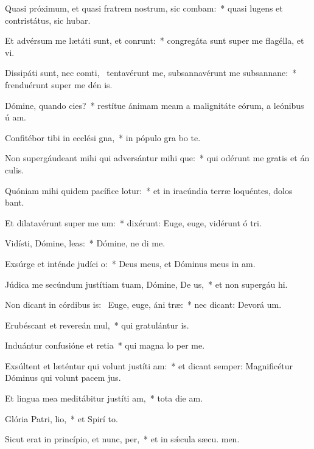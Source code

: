 \item Quasi próximum, et quasi fratrem nostrum, sic combam:~* quasi lugens et contristátus, sic hubar.
\item Et advérsum me lætáti sunt, et conrunt:~* congregáta sunt super me flagélla, et vi.
\item Dissipáti sunt, nec comti,~\pscross{} tentavérunt me, subsannavérunt me subsannane:~* frenduérunt super me dén is.
\item Dómine, quando cies?~* restítue ánimam meam a malignitáte eórum, a leónibus ú am.
\item Confitébor tibi in ecclési gna,~* in pópulo gra bo te.
\item Non supergáudeant mihi qui adversántur mihi que:~* qui odérunt me gratis et án culis.
\item Quóniam mihi quidem pacífice lotur:~* et in iracúndia terræ loquéntes, dolos bant.
\item Et dilatavérunt super me  um:~* dixérunt: Euge, euge, vidérunt ó tri.
\item Vidísti, Dómine,  leas:~* Dómine, ne di  me.
\item Exsúrge et inténde judíci o:~* Deus meus, et Dóminus meus in  am.
\item Júdica me secúndum justítiam tuam, Dómine, De us,~* et non supergáu hi.
\item Non dicant in córdibus is:~\pscross{} Euge, euge, áni træ:~* nec dicant: Devorá um.
\item Erubéscant et revereán mul,~* qui gratulántur  is.
\item Induántur confusióne et retia~* qui magna lo per me.
\item Exsúltent et læténtur qui volunt justíti am:~* et dicant semper: Magnificétur Dóminus qui volunt pacem  jus.
\item Et lingua mea meditábitur justíti am,~* tota die  am.
\item Glória Patri,  lio,~* et Spirí to.
\item Sicut erat in princípio, et nunc,  per,~* et in sǽcula sæcu. men.
